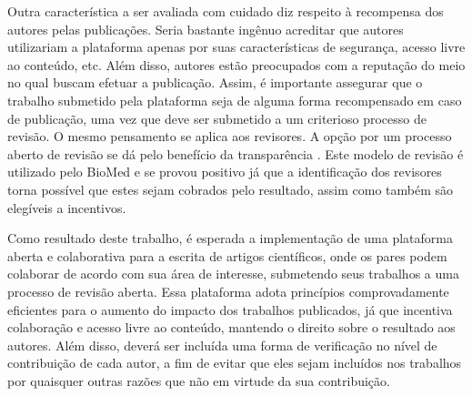 Outra característica a ser avaliada com cuidado diz respeito à recompensa dos autores pelas publicações. Seria bastante ingênuo acreditar que autores utilizariam a plataforma apenas por suas características de segurança, acesso livre ao conteúdo, etc. Além disso, autores estão preocupados com a reputação do meio no qual buscam efetuar a publicação. Assim, é importante assegurar que o trabalho submetido pela plataforma seja de alguma forma recompensado em caso de publicação, uma vez que deve ser submetido a um criterioso processo de revisão. O mesmo pensamento se aplica aos revisores. A opção por um processo aberto de revisão se dá pelo benefício da transparência \cite{InteractivePeerReview2010}. Este modelo de revisão é utilizado pelo BioMed e se provou positivo já que a identificação dos revisores torna possível que estes sejam cobrados pelo resultado, assim como também são elegíveis a incentivos.

Como resultado deste trabalho, é esperada a implementação de uma plataforma aberta e colaborativa para a escrita de artigos científicos, onde os pares podem colaborar de acordo com sua área de interesse, submetendo seus trabalhos a uma processo de revisão aberta. Essa plataforma adota princípios comprovadamente eficientes para o aumento do impacto dos trabalhos publicados, já que incentiva colaboração e acesso livre ao conteúdo, mantendo o direito sobre o resultado aos autores. Além disso, deverá ser incluída uma forma de verificação no nível de contribuição de cada autor, a fim de evitar que eles sejam incluídos nos trabalhos por quaisquer outras razões \cite{Stealing1993} que não em virtude da sua contribuição.